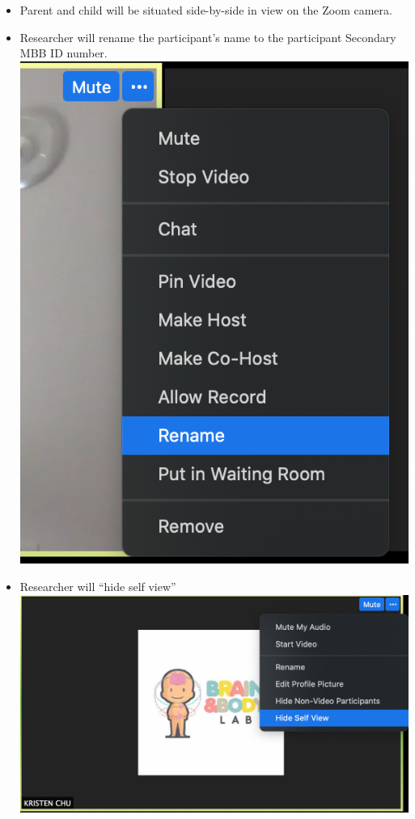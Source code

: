 \documentclass[]{book}
\providecommand{\tightlist}{%
  \setlength{\itemsep}{0pt}\setlength{\parskip}{0pt}}
\begin{document}
\begin{itemize}
\tightlist
\item
  Parent and child will be situated side-by-side in view on the Zoom camera.
\item
  Researcher will rename the participant's name to the participant Secondary MBB ID number. \includegraphics{images/zoom_parent_child_interaction/1.png}
\item
  Researcher will ``hide self view'' \includegraphics{images/zoom_parent_child_interaction/2.png}
\end{itemize}
\end{document}
